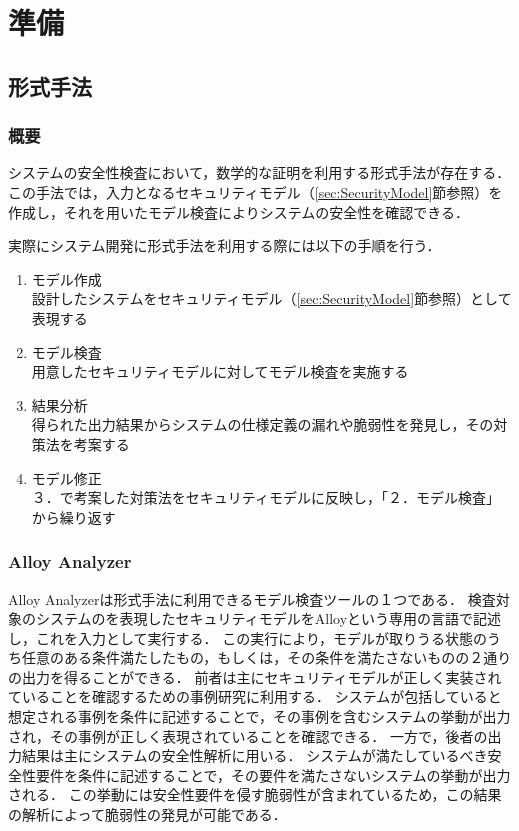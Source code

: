 \documentclass[12pt,a4paper]{jbook}
\begin{document}
\newpage

\chapter{準備}
\section{形式手法}
\subsection{概要}
システムの安全性検査において，数学的な証明を利用する形式手法が存在する．
この手法では，入力となるセキュリティモデル（\ref{sec:SecurityModel}節参照）を作成し，それを用いたモデル検査によりシステムの安全性を確認できる．

実際にシステム開発に形式手法を利用する際には以下の手順を行う．
\begin{enumerate}
\item モデル作成\\
設計したシステムをセキュリティモデル（\ref{sec:SecurityModel}節参照）として表現する
\item モデル検査\\
用意したセキュリティモデルに対してモデル検査を実施する
\item 結果分析\\
得られた出力結果からシステムの仕様定義の漏れや脆弱性を発見し，その対策法を考案する
\item モデル修正\\
３．で考案した対策法をセキュリティモデルに反映し，「２．モデル検査」から繰り返す
\end{enumerate}

\subsection{Alloy Analyzer}
Alloy Analyzerは形式手法に利用できるモデル検査ツールの１つである．
検査対象のシステムのを表現したセキュリティモデルをAlloyという専用の言語で記述し，これを入力として実行する．
この実行により，モデルが取りうる状態のうち任意のある条件満たしたもの，もしくは，その条件を満たさないものの２通りの出力を得ることができる．
前者は主にセキュリティモデルが正しく実装されていることを確認するための事例研究に利用する．
システムが包括していると想定される事例を条件に記述することで，その事例を含むシステムの挙動が出力され，その事例が正しく表現されていることを確認できる．
一方で，後者の出力結果は主にシステムの安全性解析に用いる．
システムが満たしているべき安全性要件を条件に記述することで，その要件を満たさないシステムの挙動が出力される．
この挙動には安全性要件を侵す脆弱性が含まれているため，この結果の解析によって脆弱性の発見が可能である．
\end{document}
